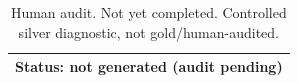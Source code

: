 \begin{table}[ht]
\centering
\caption{Human audit. Not yet completed. Controlled silver diagnostic, not gold/human-audited.}
\label{tab:human_audit}
\begin{tabular}{l}
\toprule
Status: not generated (audit pending) \\
\bottomrule
\end{tabular}
\end{table}